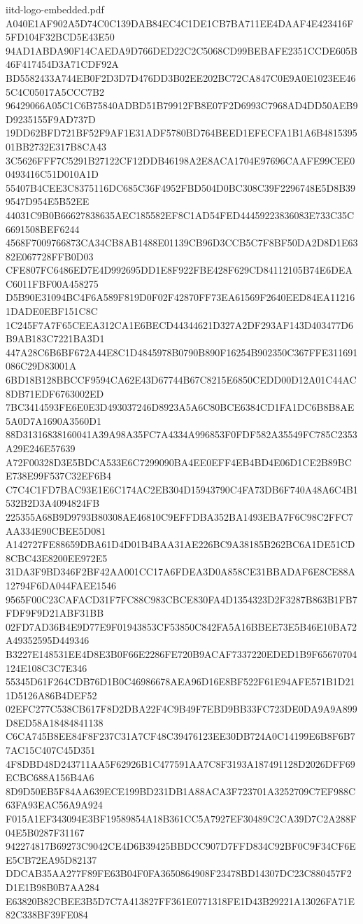 \begin{filecontents*}[overwrite]{iitd-logo-embedded.pdf}
A040E1AF902A5D74C0C139DAB84EC4C1DE1CB7BA711EE4DAAF4E423416F5FD104F32BCD5E43E50
94AD1ABDA90F14CAEDA9D766DED22C2C5068CD99BEBAFE2351CCDE605B46F417454D3A71CDF92A
BD5582433A744EB0F2D3D7D476DD3B02EE202BC72CA847C0E9A0E1023EE465C4C05017A5CCC7B2
96429066A05C1C6B75840ADBD51B79912FB8E07F2D6993C7968AD4DD50AEB9D9235155F9AD737D
19DD62BFD721BF52F9AF1E31ADF5780BD764BEED1EFECFA1B1A6B481539501BB2732E317B8CA43
3C5626FFF7C5291B27122CF12DDB46198A2E8ACA1704E97696CAAFE99CEE00493416C51D010A1D
55407B4CEE3C8375116DC685C36F4952FBD504D0BC308C39F2296748E5D8B399547D954E5B52EE
44031C9B0B66627838635AEC185582EF8C1AD54FED44459223836083E733C35C6691508BEF6244
4568F7009766873CA34CB8AB1488E01139CB96D3CCB5C7F8BF50DA2D8D1E6382E067728FFB0D03
CFE807FC6486ED7E4D992695DD1E8F922FBE428F629CD84112105B74E6DEAC6011FBF00A458275
D5B90E31094BC4F6A589F819D0F02F42870FF73EA61569F2640EED84EA112161DADE0EBF151C8C
1C245F7A7F65CEEA312CA1E6BECD44344621D327A2DF293AF143D403477D6B9AB183C7221BA3D1
447A28C6B6BF672A44E8C1D4845978B0790B890F16254B902350C367FFE311691086C29D83001A
6BD18B128BBCCF9594CA62E43D67744B67C8215E6850CEDD00D12A01C44AC8DB71EDF6763002ED
7BC3414593FE6E0E3D493037246D8923A5A6C80BCE6384CD1FA1DC6B8B8AE5A0D7A1690A3560D1
88D31316838160041A39A98A35FC7A4334A996853F0FDF582A35549FC785C2353A29E246E57639
A72F00328D3E5BDCA533E6C7299090BA4EE0EFF4EB4BD4E06D1CE2B89BCE738E99F537C32EF6B4
C7C4C1FD7BAC93E1E6C174AC2EB304D15943790C4FA73DB6F740A48A6C4B1532B2D3A4094824FB
225355A68B9D9793B80308AE46810C9EFFDBA352BA1493EBA7F6C98C2FFC7AA334E90CBEE5D081
A142727FE88659DBA61D4D01B4BAA31AE226BC9A38185B262BC6A1DE51CD8CBC43E8200EE972E5
31DA3F9BD346F2BF42AA001CC17A6FDEA3D0A858CE31BBADAF6E8CE88A12794F6DA044FAEE1546
9565F00C23CAFACD31F7FC88C983CBCE830FA4D1354323D2F3287B863B1FB7FDF9F9D21ABF31BB
02FD7AD36B4E9D77E9F01943853CF53850C842FA5A16BBEE73E5B46E10BA72A49352595D449346
B3227E148531EE4D8E3B0F66E2286FE720B9ACAF7337220EDED1B9F65670704124E108C3C7E346
55345D61F264CDB76D1B0C46986678AEA96D16E8BF522F61E94AFE571B1D211D5126A86B4DEF52
02EFC277C538CB617F8D2DBA22F4C9B49F7EBD9BB33FC723DE0DA9A9A899D8ED58A18484841138
C6CA745B8EE84F8F237C31A7CF48C39476123EE30DB724A0C14199E6B8F6B77AC15C407C45D351
4F8DBD48D243711AA5F62926B1C477591AA7C8F3193A187491128D2026DFF69ECBC688A156B4A6
8D9D50EB5F84AA639ECE199BD231DB1A88ACA3F723701A3252709C7EF988C63FA93EAC56A9A924
F015A1EF343094E3BF19589854A18B361CC5A7927EF30489C2CA39D7C2A288F04E5B0287F31167
942274817B69273C9042CE4D6B39425BBDCC907D7FFD834C92BF0C9F34CF6EE5CB72EA95D82137
DDCAB35AA277F89FE63B04F0FA3650864908F23478BD14307DC23C880457F2D1E1B98B0B7AA284
E63820B82CBEE3B5D7C7A413827FF361E0771318FE1D43B29221A13026FA71E82C338BF39FE084

\end{filecontents*}

